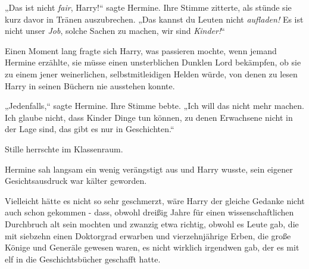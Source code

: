 „Das ist nicht \emph{fair}, Harry!“ sagte Hermine. Ihre Stimme zitterte, als stünde sie kurz davor in Tränen auszubrechen. „Das kannst du Leuten nicht \emph{aufladen!} Es ist nicht unser \emph{Job}, solche Sachen zu machen, wir sind \emph{Kinder!}“

Einen Moment lang fragte sich Harry, was passieren mochte, wenn jemand Hermine erzählte, sie müsse einen unsterblichen Dunklen Lord bekämpfen, ob sie zu einem jener weinerlichen, selbstmitleidigen Helden würde, von denen zu lesen Harry in seinen Büchern nie ausstehen konnte.

„Jedenfalls,“ sagte Hermine. Ihre Stimme bebte. „Ich will das nicht mehr machen. Ich glaube nicht, dass Kinder Dinge tun können, zu denen Erwachsene nicht in der Lage sind, das gibt es nur in Geschichten.“

Stille herrschte im Klassenraum.

Hermine sah langsam ein wenig verängstigt aus und Harry wusste, sein eigener Gesichtsausdruck war kälter geworden.

Vielleicht hätte es nicht so sehr geschmerzt, wäre Harry der gleiche Gedanke nicht auch schon gekommen - dass, obwohl dreißig Jahre für einen wissenschaftlichen Durchbruch alt sein mochten und zwanzig etwa richtig, obwohl es Leute gab, die mit siebzehn einen Doktorgrad erwarben und vierzehnjährige Erben, die große Könige und Generäle gewesen waren, es nicht wirklich irgendwen gab, der es mit elf in die Geschichtsbücher geschafft hatte.


